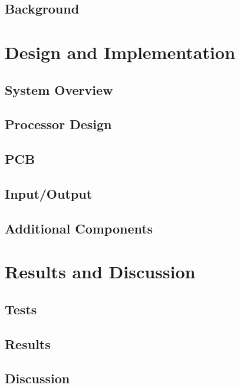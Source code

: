 \documentclass[a4paper]{report}
\begin{document}
\chapter{Background}
	

\part{Design and Implementation}

\chapter{System Overview}
    

\chapter{Processor Design}
	

\chapter{PCB}
	

\chapter{Input/Output}
	

\chapter{Additional Components}
    

\part{Results and Discussion}

\chapter{Tests}
	

\chapter{Results}
	

\chapter{Discussion}
	
\end{document}
